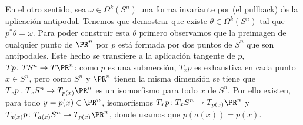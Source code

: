 \documentclass[12pt]{article}
\begin{document}
En el otro sentido, sea \( \omega \in \Omega^k(S^n) \) una forma invariante por (el
pullback) de la aplicación antipodal. Tenemos que demostrar que existe \( \theta \in
\Omega^k(S^n) \) tal que \( p^\ast \theta = \omega \). Para poder construir esta \( \theta
\) primero observamos que la preimagen de cualquier punto de \( \PR^n \) por \( p \) está
formada por dos puntos de \( S^n \) que son antipodales. Este hecho se transfiere a la
aplicación tangente de \( p \), \( Tp \colon TS^n \to T\PR^n \):  como \( p \) es una
submersión, \( T_xp \) es exhaustiva en cada punto \( x \in S^n \), pero como \( S^n \)
y \( \PR^n \) tienen la misma dimensión se tiene que\( T_xp : T_x S^n \to T_{p(x)}\PR^n \)
es un isomorfismo para todo \( x \) de \( S^n \). Por ello existen, para todo \( y = p(x) \in
\PR^n \), isomorfismos \( T_xp \colon T_xS^n \to T_{p(x)}\PR^n \) y \( T_{a(x)}p
\colon T_{a(x)}S^n \to T_{p(x)}\PR^n \), donde usamos que \( p(a(x)) = p(x) \).
\end{document}
